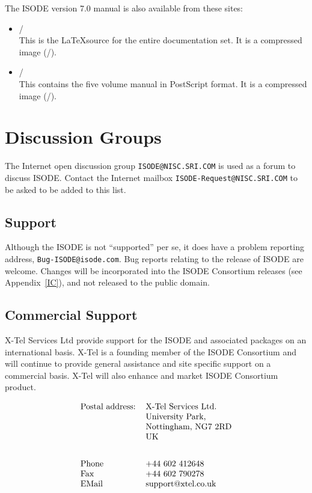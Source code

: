The ISODE version 7.0 manual is also available from these sites:

\begin{itemize}

\item  \Docfile/\\
This is the \LaTeX source for the entire documentation set.
It is a compressed  image (\DocSize/).

\item  \PSfile/\\
This contains the five volume manual in PostScript format.
It is a compressed  image (\PSsize/).

\end{itemize}

\newpage\section*	{Discussion Groups}
The Internet open discussion group {\tt ISODE@NISC.SRI.COM\/} is
used as a forum to discuss ISODE.
Contact the Internet mailbox {\tt ISODE-Request@NISC.SRI.COM\/}
to be asked to be added to this list.

\subsection*{Support}
Although the ISODE is not ``supported'' per se, it does have a problem
reporting address, {\tt Bug-ISODE@isode.com\/}.  
Bug reports relating to the release of ISODE are
welcome.   Changes will be incorporated into the ISODE Consortium
releases (see Appendix~\ref{IC}), and not released to the public domain.  

\subsection*{Commercial Support}
X-Tel Services Ltd provide support for the ISODE and associated
packages on an international basis.  X-Tel is a founding member of
the ISODE Consortium and will continue to provide general
assistance and site specific support on a commercial basis.  
X-Tel will also enhance and market ISODE Consortium product. 

\[\begin{tabular}{ll}
Postal address:&	X-Tel Services Ltd.\\
&	University Park,\\
&	Nottingham, NG7 2RD\\
&        UK\\[2em]
Phone&		+44 602 412648\\
Fax&		+44 602 790278\\
EMail&	support@xtel.co.uk\\
\end{tabular}\]

